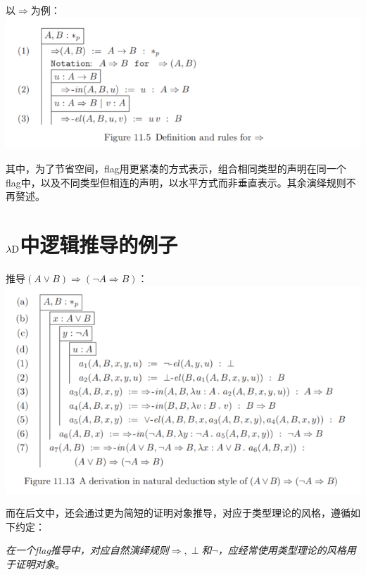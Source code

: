 \documentclass[UTF8]{article}
\begin{document}
		以$\Rightarrow$为例：\\
		\includegraphics[width=0.93\linewidth]{"../imgs/11-6.png"}
		
		其中，为了节省空间，flag用更紧凑的方式表示，组合相同类型的声明在同一个flag中，以及不同类型但相连的声明，以水平方式而非垂直表示。其余演绎规则不再赘述。
		
	\section{$\lambda{\rm D}$中逻辑推导的例子}
	\noindent
	推导$(A\lor B)\Rightarrow(\neg{A}\Rightarrow B)$：\\
	\includegraphics[width=0.93\linewidth]{"../imgs/11-7.png"}
	
		而在后文中，还会通过更为简短的证明对象推导，对应于类型理论的风格，遵循如下约定：
		
		\textit{在一个flag推导中，对应自然演绎规则$\Rightarrow,\perp$和$\neg$，应经常使用类型理论的风格用于证明对象}。
		
\end{document}
